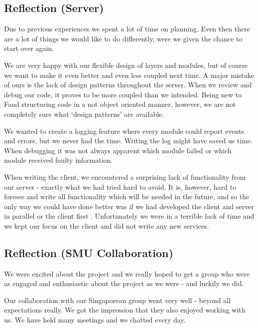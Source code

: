\subsection{Reflection (Server)}
Due to previous experiences we spent a lot of time on planning. Even then there are a lot of things we would like to do differently, were we given the chance to start over again.

We are very happy with our flexible design of layers and modules, but of course we want to make it even better and even less coupled next time. A major mistake of ours is the lack of design patterns throughout the server. When we review and debug our code, it proves to be more coupled than we intended. Being new to F\Sh and structuring code in a not object oriented manner, however, we are not completely sure what `design patterns' are available.

We wanted to create a logging feature where every module could report events and errors, but we never had the time. Writing the log might have saved us time. When debugging it was not always apparent which module failed or which module received faulty information. 

When writing the client, we encountered a surprising lack of functionality from our server - exactly what we had tried hard to avoid. It is, however, hard to foresee and write all functionality which will be needed in the future, and so the only way we could have done better was if we had developed the client and server in parallel or the client first .
Unfortunately we were in a terrible lack of time and we kept our focus on the client and did not write any new services.

\subsection{Reflection (SMU Collaboration)}
We were excited about the project and we really hoped to get a group who were as engaged and enthusiastic about the project as we were - and luckily we did.

Our collaboration with our Singaporean group went very well - beyond all expectations really. We got the impression that they also enjoyed working with us. We have held many meetings and we chatted every day.

\newpage